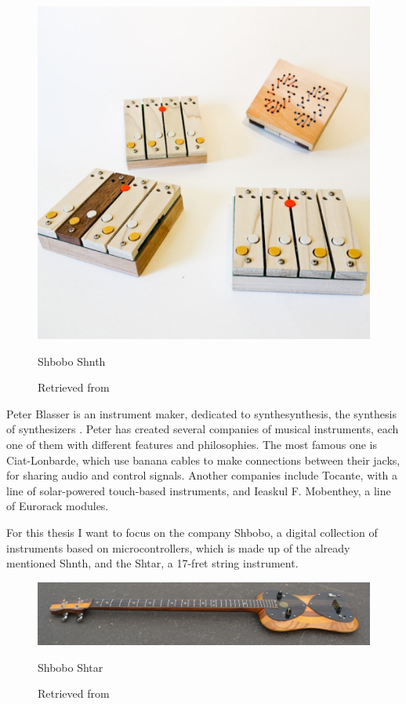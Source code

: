 \begin{figure}[ht]
  \centering
  \includegraphics[width=0.75\linewidth,height=0.25\textheight,keepaspectratio]{images/shbobo-shnth.jpg}
  \caption{Shbobo Shnth}
  \caption*{Retrieved from \cite{website-shbobo-current}}
  \label{fig:shbobo-shnth}
\end{figure}

Peter Blasser is an instrument maker, dedicated to \gls{synthesynthesis}, the synthesis of synthesizers \cite{blasser2015stores}. Peter has created several companies of musical instruments, each one of them with different features and philosophies. The most famous one is Ciat-Lonbarde, which use banana cables to make connections between their jacks, for sharing audio and control signals. Another companies include Tocante, with a line of solar-powered touch-based instruments, and Ieaskul F. Mobenthey, a line of Eurorack modules.

For this thesis I want to focus on the company Shbobo, a digital collection of instruments based on microcontrollers, which is made up of the already mentioned Shnth, and the Shtar, a 17-fret string instrument.

\begin{figure}[ht]
  \centering
    \includegraphics[width=0.75\linewidth,height=0.25\textheight,keepaspectratio]{images/shbobo-shtar.jpg}
  \caption{Shbobo Shtar}
  \caption*{Retrieved from \cite{website-shbobo-current}}
  \label{fig:shbobo-shtar}
\end{figure}

